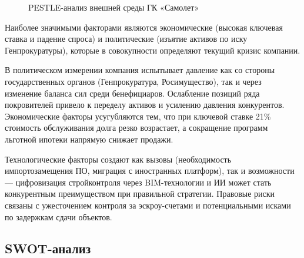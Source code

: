 \documentclass[12pt,a4paper]{article}
\begin{document}
\begin{figure}[H]
\caption{PESTLE-анализ внешней среды ГК «Самолет»}
\label{fig:pestle}
\end{figure}

Наиболее значимыми факторами являются экономические (высокая ключевая ставка и падение спроса) и политические (изъятие активов по иску Генпрокуратуры), которые в совокупности определяют текущий кризис компании.

В политическом измерении компания испытывает давление как со стороны государственных органов (Генпрокуратура, Росимущество), так и через изменение баланса сил среди бенефициаров. Ослабление позиций ряда покровителей привело к переделу активов и усилению давления конкурентов. Экономические факторы усугубляются тем, что при ключевой ставке 21\% стоимость обслуживания долга резко возрастает, а сокращение программ льготной ипотеки напрямую снижает продажи.

Технологические факторы создают как вызовы (необходимость импортозамещения ПО, миграция с иностранных платформ), так и возможности --- цифровизация стройконтроля через BIM-технологии и ИИ может стать конкурентным преимуществом при правильной стратегии. Правовые риски связаны с ужесточением контроля за эскроу-счетами и потенциальными исками по задержкам сдачи объектов.

\subsection{SWOT-анализ}
\end{document}
